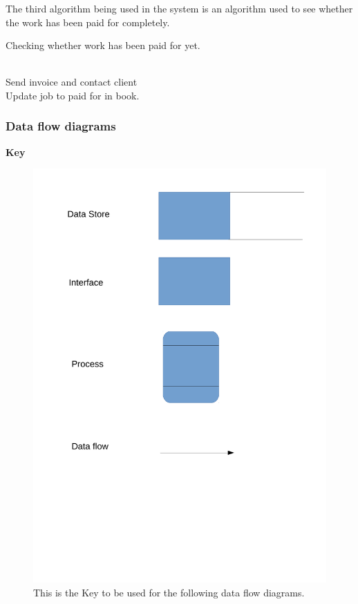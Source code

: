 The third algorithm being used in the system is an algorithm used to see whether the work has been paid for completely.


\begin{algorithm}[H]
	\label{fig:algorithm_paid}
		\caption{Checking whether work has been paid for yet.}
	\begin{algorithmic}[1]
			 \\ Send invoice and contact client
			\Else
			\EndIf
		\EndWhile
		\\Update job to paid for in book.
	\end{algorithmic}
\end{algorithm}




\subsubsection{Data flow diagrams}

\textbf{Key}
\begin{figure}[H]
\includegraphics[width=\textwidth]{./Analysis/images/key.pdf}
    \caption{This is the Key to be used for the following data flow diagrams.} \label{fig:data_flow_diagram_key}
\end{figure}

